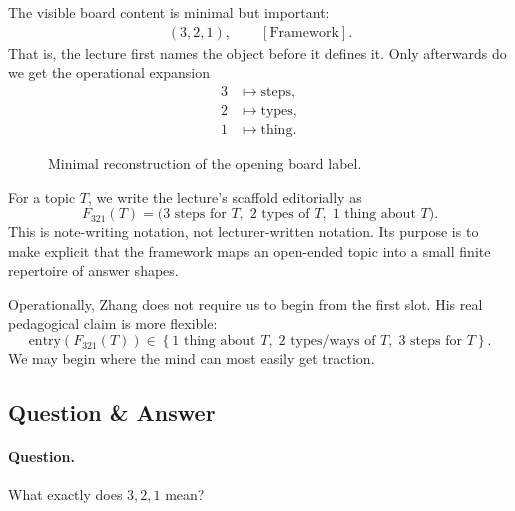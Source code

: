 The visible board content is minimal but important:
\begin{align}
\left(3,2,1\right), \qquad \left[\text{Framework}\right].
\end{align}
That is, the lecture first names the object before it defines it. Only afterwards do we get the operational expansion
\begin{align}
3 &\mapsto \text{steps},\\
2 &\mapsto \text{types},\\
1 &\mapsto \text{thing}.
\end{align}

\begin{figure}[h]
\centering
{}
\caption{Minimal reconstruction of the opening board label.}
\end{figure}

\begin{definition}
For a topic \(T\), we write the lecture’s scaffold editorially as
\begin{equation}
F_{321}(T)
=
\bigl(
\text{3 steps for }T,\;
\text{2 types of }T,\;
\text{1 thing about }T
\bigr).
\end{equation}
This is note-writing notation, not lecturer-written notation. Its purpose is to make explicit that the framework maps an open-ended topic into a small finite repertoire of answer shapes.
\end{definition}

\begin{remark}
Operationally, Zhang does not require us to begin from the first slot. His real pedagogical claim is more flexible:
\begin{equation}
\text{entry}(F_{321}(T))
\in
\left\{
\text{1 thing about }T,\;
\text{2 types/ways of }T,\;
\text{3 steps for }T
\right\}.
\end{equation}
We may begin where the mind can most easily get traction.
\end{remark}

\subsection{Question \& Answer}

\paragraph{Question.} What exactly does \(3,2,1\) mean?

